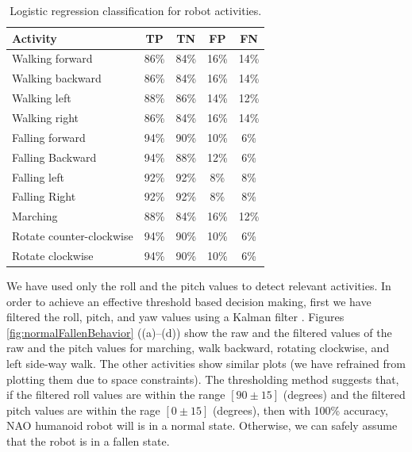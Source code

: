 \documentclass[letterpaper]{article}
\begin{document}
\begin{table}[!ht]
\caption{Logistic regression classification for robot activities.}
	\label{tab:robot-logistic-class}
	\centering
		\begin{tabular} {| l | c | c | c| c|}
		\hline
			{\bf Activity} & {\bf  TP}  &	{\bf TN}  &	{\bf FP} &	{\bf FN} \\ 
\hline
			Walking forward	& 86\%	& 84\%	& 16\%	& 14\% \\ \hline
			Walking backward	& 86\%	& 84\%	& 16\%	& 14\% \\ \hline
			Walking left 	& 88\%	& 86\%	& 14\%	& 12\% \\ \hline
			Walking right 	& 86\%	& 84\%	& 16\%	& 14\% \\ \hline
			Falling forward	& 94\%	& 90\%	& 10\%	& 6\%	 \\ \hline
			Falling Backward	& 94\%	& 88\%	& 12\%	& 6\%	 \\ \hline
			Falling left	& 92\%	& 92\%	& 8\%	& 8\%	 \\ \hline
			Falling Right	& 92\%	& 92\%	& 8\%	& 8\%	 \\ \hline
			Marching	& 88\%	& 84\%	& 16\%	& 12\%	 \\ \hline
			Rotate counter-clockwise	& 94\%	& 90\%	& 10\%	& 6\%	 \\ \hline
			Rotate clockwise	& 94\%	& 90\%	& 10\%	& 6\%	 \\ \hline
		\end{tabular}
\end{table}


We have used only the roll and the pitch values  to detect relevant activities. In order to achieve 
an effective threshold based decision making, first we have filtered the roll, pitch, and
yaw values using a Kalman filter \cite{Welch:1995:IKF:897831}. Figures 
\ref{fig:normalFallenBehavior} ((a)--(d)) show
the raw and the filtered values of the raw and the pitch values for marching, walk backward,
rotating clockwise, and left side-way walk. The other activities show similar plots (we have 
refrained from plotting them due to space constraints). The thresholding method
suggests that, if the filtered roll values are within the range $[90\pm15]$ (degrees) and the
filtered pitch values are within the rage $[0\pm15]$ (degrees), then with 100\% accuracy, NAO 
humanoid robot will is in a normal state. Otherwise, we can safely assume that the robot is in 
a fallen state.   
\end{document}
